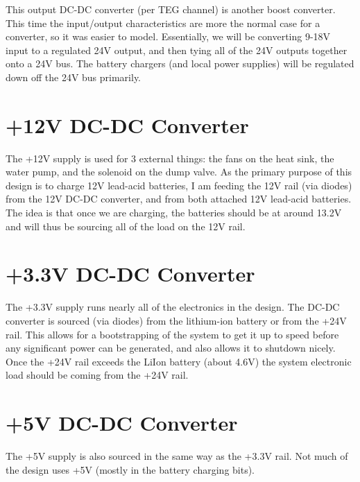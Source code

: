 \documentclass{report}
\begin{document}
This output DC-DC converter (per TEG channel) is another boost converter.  This time the input/output characteristics are more the normal case for a converter,
so it was easier to model.  Essentially, we will be converting 9-18V input to a
regulated 24V output, and then tying all of the 24V outputs together onto a 
24V bus.  The battery chargers (and local power supplies) will be regulated
down off the 24V bus primarily.

\section{+12V DC-DC Converter}

The +12V supply is used for 3 external things: the fans on the heat sink, the
water pump, and the solenoid on the dump valve.  As the primary purpose of this
design is to charge 12V lead-acid batteries, I am feeding the 12V rail (via
diodes) from the 12V DC-DC converter, and from both attached 12V lead-acid
batteries.  The idea is that once we are charging, the batteries should be at
around 13.2V and will thus be sourcing all of the load on the 12V rail.

\section{+3.3V DC-DC Converter}

The +3.3V supply runs nearly all of the electronics in the design.  The DC-DC
converter is sourced (via diodes) from the lithium-ion battery or from the +24V
rail.  This allows for a bootstrapping of the system to get it up to speed
before any significant power can be generated, and also allows it to shutdown
nicely.  Once the +24V rail exceeds the LiIon battery (about 4.6V) the
system electronic load should be coming from the +24V rail.

\section{+5V DC-DC Converter}

The +5V supply is also sourced in the same way as the +3.3V rail.  Not much
of the design uses +5V (mostly in the battery charging bits).

\eject
{}
\nocite{*}


\end{document}
